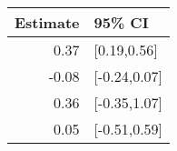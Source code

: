\begin{tabular}{rl}
  \hline
Estimate & 95\% CI \\ 
  \hline
0.37 & [0.19,0.56] \\ 
  -0.08 & [-0.24,0.07] \\ 
  0.36 & [-0.35,1.07] \\ 
  0.05 & [-0.51,0.59] \\ 
   \hline
\end{tabular}

